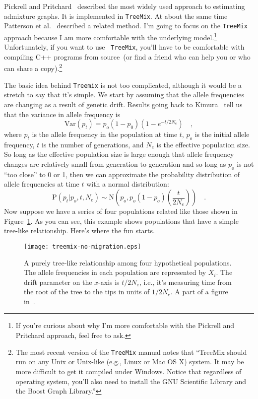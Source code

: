 \documentclass[12pt]{article}
\begin{document}
Pickrell and Pritchard~\cite{Pickrell-Pritchard-2012} described the
most widely used approach to estimating admixture graphs. It is
implemented in {\tt TreeMix}. At about the same time
Patterson et al.~\cite{Patterson-etal-2012} described a related
method. I'm going to focus on the {\tt TreeMix} approach because I am
more comfortable with the underlying model.\footnote{If you're curious
  about why I'm more comfortable with the Pickrell and Pritchard
  approach, feel free to ask.}  Unfortunately, if you want to use {\tt
  TreeMix}, you'll have to be comfortable with compiling C++ programs
from source~(or find a friend who can help you or who can share a
copy).\footnote{The most recent version of the {\tt TreeMix} manual
  notes that ``TreeMix should run on any Unix or Unix-like (e.g.,
  Linux or Mac OS X) system. It may be more difficult to get it
  compiled under Windows. Notice that regardless of operating system,
  you'll also need to install the GNU Scientific Library and the Boost
  Graph Library.''}

The basic idea behind {\tt Treemix} is not too complicated, although
it would be a stretch to say that it's simple. We start by assuming
that the allele frequencies are changing as a result of genetic
drift. Results going back to Kimura~\cite{Kimura-1955} tell us that
the variance in allele frequency is
\[
  \mbox{Var}(p_t) = p_o(1-p_0)\left(1 - e^{-t/2N_e}\right) \quad ,
\]
where $p_t$ is the allele frequency in the population at time $t$,
$p_o$ is the initial allele frequency, $t$ is the number of
generations, and $N_e$ is the effective population size. So long as
the effective population size is large enough that allele frequency
changes are relatively small from generation to generation and so long
as $p_o$ is not ``too close'' to 0 or 1, then we can approximate the
probability distribution of allele frequencies at time $t$ with a
normal distribution:
\[
  \mbox{P}(p_t|p_o,t,N_e) \sim \mbox{N}\left(p_o,
    p_o(1-p_o)\left(\frac{t}{2N_e}\right)\right) \quad .
\]
Now suppose we have a series of four populations related like those
shown in Figure~\ref{fig:treemix-no-migration}. As you can see, this
example shows populations that have a simple tree-like
relationship. Here's where the fun starts.

\begin{figure}
  \begin{center}
    \texttt{[image: treemix-no-migration.eps]}
  \end{center}
  \caption{A purely tree-like relationship among four hypothetical
    populations. The allele frequencies in each population are
    represented by $X_i$. The drift parameter on the $x$-axis is $t/2N_e$,
    i.e., it's measuring time from the root of the tree to the tips in
    units of $1/2N_e$. A part of a figure in~\cite{Pickrell-Pritchard-2012}.}\label{fig:treemix-no-migration}
\end{figure}
\end{document}
